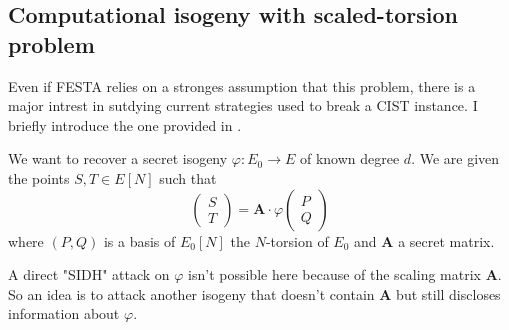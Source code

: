 \documentclass[11pt]{article}
\begin{document}
	\subsection{Computational isogeny with scaled-torsion problem}
	Even if FESTA relies on a stronges assumption that this problem, there is a major intrest
	in sutdying current strategies used to break a CIST instance. I briefly introduce
	the one provided in \cite{polyCIST}.
	
	We want to recover a secret isogeny $\varphi:E_0\to E$ of known degree $d$. We are given
	the points $S,T\in E[N]$ such that
	\[
		\begin{pmatrix} S \\ T \end{pmatrix} = \mathbf A\cdot \varphi \begin{pmatrix} P \\ Q \end{pmatrix}
	\] 
	where $(P,Q)$ is a basis of  $E_0[N]$ the $N$-torsion of $E_0$ and  $\mathbf A$ a secret
	matrix.

	
	A direct "SIDH" attack on $\varphi$ isn't possible here because of the scaling matrix
	$\mathbf A$. So an idea is to attack another isogeny that doesn't contain $\mathbf A$
	but still discloses information about $\varphi$.
\end{document}
